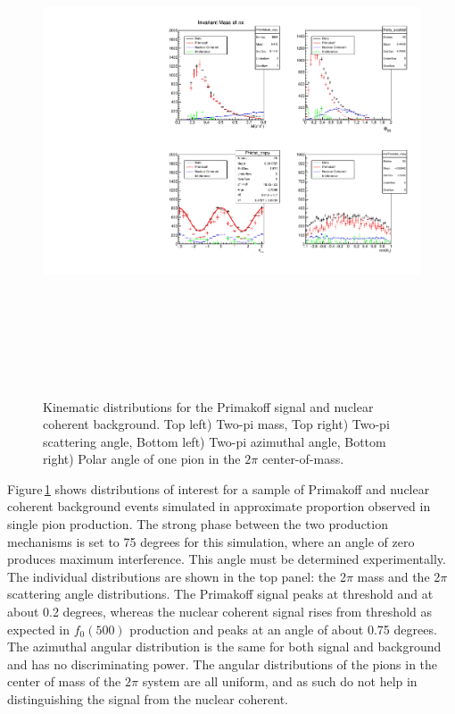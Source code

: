  \begin{figure}[tbp]
\begin{center}
\includegraphics[height=15cm,clip=true]{figures/twopi_primakoff_DSelect_test_File_100000_decomposition_PrimNC.pdf}
\caption{Kinematic distributions for the Primakoff signal and nuclear coherent background.
Top left) Two-pi mass, Top right) Two-pi scattering angle, Bottom left) Two-pi azimuthal angle, 
Bottom right) Polar angle of one pion in the $2\pi$ center-of-mass.
\label{fig:decomposition_PrimNC}}
\end{center} 
\end{figure}


Figure\,\ref{fig:decomposition_PrimNC} shows distributions of interest for a sample of Primakoff and
nuclear coherent background events simulated in approximate proportion observed in single pion production. The strong phase between the two production mechanisms is set to
75 degrees for this simulation, where an angle of zero produces maximum interference. This angle must be determined experimentally. 
The individual distributions are shown in the top panel: the 2$\pi$ mass and the 2$\pi$ scattering angle distributions. The Primakoff signal peaks at threshold and at about 0.2 degrees, whereas the nuclear coherent signal rises from threshold as expected in $f_0(500)$ production and peaks at an angle of about 0.75 degrees. The azimuthal angular distribution is the same for both signal and background and has no discriminating power. The angular distributions of the pions in
the center of mass of the $2\pi$ system are all uniform, and as such do not help in distinguishing the signal from the nuclear coherent.  

